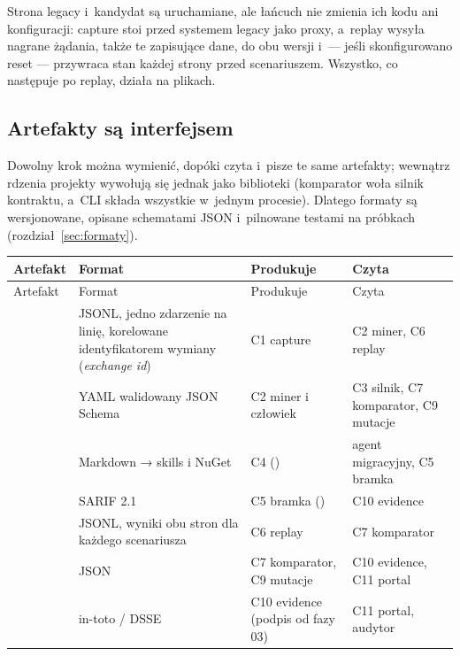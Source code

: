 Strona legacy i~kandydat są uruchamiane, ale łańcuch nie zmienia ich kodu ani konfiguracji:
capture stoi przed systemem legacy jako proxy, a~replay wysyła nagrane żądania, także te
zapisujące dane, do obu wersji i~--- jeśli skonfigurowano reset --- przywraca stan każdej
strony przed scenariuszem.
Wszystko, co następuje po replay, działa na plikach.


\subsection{Artefakty są interfejsem}\label{sec:architektura-artefakty}

 Dowolny krok można
wymienić, dopóki czyta i~pisze te same artefakty; wewnątrz rdzenia projekty wywołują się
jednak jako biblioteki (komparator woła silnik kontraktu, a~CLI składa wszystkie w~jednym
procesie). Dlatego formaty są wersjonowane, opisane schematami JSON i~pilnowane testami na
próbkach (rozdział~\ref{sec:formaty}).

\begin{xltabular}{\linewidth}{@{}>{\raggedright\arraybackslash}p{2.9cm} >{\raggedright\arraybackslash}X >{\raggedright\arraybackslash}X >{\raggedright\arraybackslash}X@{}}
\toprule
Artefakt & Format & Produkuje & Czyta \\
\midrule
\endfirsthead
\toprule
Artefakt & Format & Produkuje & Czyta \\
\midrule
\endhead
{} & JSONL, jedno zdarzenie na linię, korelowane identyfikatorem wymiany (\emph{exchange id}) & C1 capture & C2 miner, C6 replay \\
 & YAML walidowany JSON Schema & C2 miner i człowiek & C3 silnik, C7 komparator, C9 mutacje \\
 & Markdown → skills i NuGet & C4 () & agent migracyjny, C5 bramka \\
 & SARIF 2.1 & C5 bramka () & C10 evidence \\
 & JSONL, wyniki obu stron dla każdego scenariusza & C6 replay & C7 komparator \\
 & JSON & C7 komparator, C9 mutacje & C10 evidence, C11 portal \\
 & in-toto / DSSE & C10 evidence (podpis od fazy 03) & C11 portal, audytor \\
\bottomrule
\end{xltabular}

